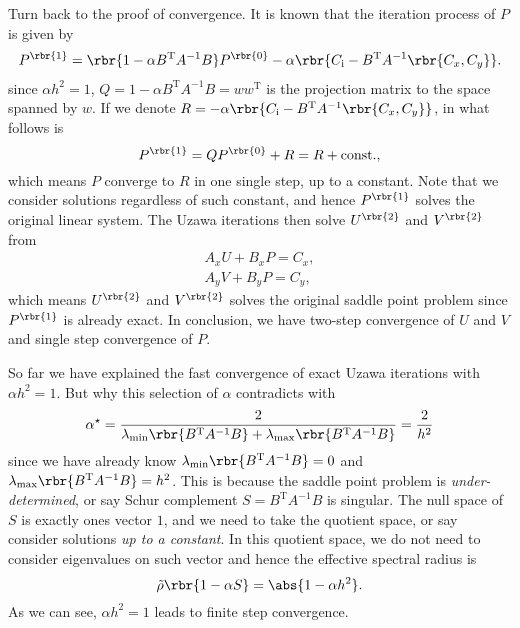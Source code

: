 \documentclass[english, nochinese]{pnote}
\begin{document}
Turn back to the proof of convergence. It is known that the iteration process of $P$ is given by
\begin{gather}
P^{\rbr{1}} = \rbr{ 1 - \alpha B^{\text{T}} A^{-1} B } P^{\rbr{0}} - \alpha \rbr{ C_{\text{i}} - B^{\text{T}} A^{-1} \rbr{ C_x, C_y } }.
\end{gather}
since $ \alpha h^2 = 1 $, $ Q = 1 - \alpha B^{\text{T}} A^{-1} B = w w^{\text{T}} $ is the projection matrix to the space spanned by $w$. If we denote $ R = - \alpha \rbr{ C_{\text{i}} - B^{\text{T}} A^{-1} \rbr{ C_x, C_y } } $, in what follows is
\begin{equation}
P^{\rbr{1}} = Q P^{\rbr{0}} + R = R + \text{const.},
\end{equation}
which means $P$ converge to $R$ in one single step, up to a constant. Note that we consider solutions regardless of such constant, and hence $P^{\rbr{1}}$ solves the original linear system. The Uzawa iterations then solve $U^{\rbr{2}}$ and $V^{\rbr{2}}$ from
\begin{gather}
A_x U + B_x P = C_x, \\
A_y V + B_y P = C_y,
\end{gather}
which means $U^{\rbr{2}}$ and $V^{\rbr{2}}$ solves the original saddle point problem since $P^{\rbr{1}}$ is already exact. In conclusion, we have two-step convergence of $U$ and $V$ and single step convergence of $P$.

So far we have explained the fast convergence of exact Uzawa iterations with $ \alpha h^2 = 1 $. But why this selection of $\alpha$ contradicts with
\begin{equation}
\alpha^{\star} = \frac{2}{ \lambda_{\text{min}} \rbr{ B^{\text{T}} A^{-1} B } + \lambda_{\text{max}} \rbr{ B^{\text{T}} A^{-1} B } } = \frac{2}{h^2}
\end{equation}
since we have already know $ \lambda_{\text{min}} \rbr{ B^{\text{T}} A^{-1} B } = 0 $ and $ \lambda_{\text{max}} \rbr{ B^{\text{T}} A^{-1} B } = h^2 $. This is because the saddle point problem is \emph{under-determined}, or say Schur complement $ S = B^{\text{T}} A^{-1} B $ is singular. The null space of $S$ is exactly ones vector $1$, and we need to take the quotient space, or say consider solutions \emph{up to a constant}. In this quotient space, we do not need to consider eigenvalues on such vector and hence the effective spectral radius is
\begin{equation}
\tilde{\rho} \rbr{ 1 - \alpha S } = \abs{ 1 - \alpha h^2 }.
\end{equation}
As we can see, $ \alpha h^2 = 1 $ leads to finite step convergence.
\end{document}
